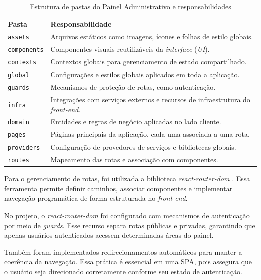 \begin{table}[H]
\centering
\begin{tabular}{|l|p{10cm}|}
\hline
\textbf{Pasta} & \textbf{Responsabilidade} \\ \hline
\texttt{assets} & Arquivos estáticos como imagens, ícones e folhas de estilo globais. \\ \hline
\texttt{components} & Componentes visuais reutilizáveis da \emph{interface} (\emph{UI}). \\ \hline
\texttt{contexts} & Contextos globais para gerenciamento de estado compartilhado. \\ \hline
\texttt{global} & Configurações e estilos globais aplicados em toda a aplicação. \\ \hline
\texttt{guards} & Mecanismos de proteção de rotas, como autenticação. \\ \hline
\texttt{infra} & Integrações com serviços externos e recursos de infraestrutura do \emph{front-end}. \\ \hline
\texttt{domain} & Entidades e regras de negócio aplicadas no lado cliente. \\ \hline
\texttt{pages} & Páginas principais da aplicação, cada uma associada a uma rota. \\ \hline
\texttt{providers} & Configuração de provedores de serviços e bibliotecas globais. \\ \hline
\texttt{routes} & Mapeamento das rotas e associação com componentes. \\ \hline
\end{tabular}
\caption{Estrutura de pastas do Painel Administrativo e responsabilidades}
\label{tab:pastas_painel}
\end{table}

Para o gerenciamento de rotas, foi utilizada a biblioteca \emph{react-router-dom} \cite{reactrouter}. Essa ferramenta permite definir caminhos, associar componentes e implementar navegação programática de forma estruturada no \emph{front-end}.

No projeto, o \emph{react-router-dom} foi configurado com mecanismos de autenticação por meio de \emph{guards}. Esse recurso separa rotas públicas e privadas, garantindo que apenas usuários autenticados acessem determinadas áreas do painel.

Também foram implementados redirecionamentos automáticos para manter a coerência da navegação. Essa prática é essencial em uma SPA, pois assegura que o usuário seja direcionado corretamente conforme seu estado de autenticação.


